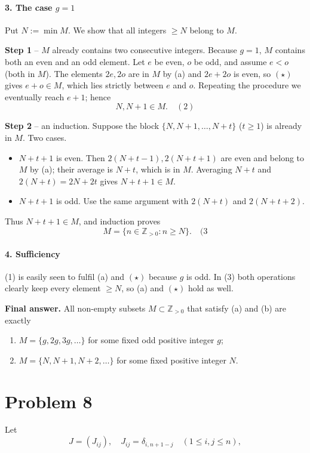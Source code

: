 \documentclass[12pt,a4paper]{article}
\theoremstyle{definition}
\begin{document}
\paragraph{3. The case $g = 1$}
Put $N := \min M$. We show that all integers $\geq N$ belong to $M$.

\textbf{Step 1} -- $M$ already contains two consecutive integers.
Because $g=1$, $M$ contains both an even and an odd element. Let $e$ be even, $o$ be odd, and assume $e < o$ (both in $M$). The elements $2e, 2o$ are in $M$ by (a) and $2e+2o$ is even, so $(\star)$ gives $e+o \in M$, which lies strictly between $e$ and $o$. Repeating the procedure we eventually reach $e+1$; hence
\[
N, N+1 \in M. \quad {(2)}
\]

\textbf{Step 2} -- an induction.
Suppose the block $\{N, N+1, \ldots, N+t\}$ ($t \geq 1$) is already in $M$.
Two cases.

\begin{itemize}
\item $N+t+1$ is even.
Then $2(N+t-1), 2(N+t+1)$ are even and belong to $M$ by (a); their average is $N+t$, which is in $M$. Averaging $N+t$ and $2(N+t) = 2N+2t$ gives $N+t+1 \in M$.

\item $N+t+1$ is odd. Use the same argument with $2(N+t)$ and $2(N+t+2)$.
\end{itemize}

Thus $N+t+1 \in M$, and induction proves
\[
M = \{ n \in \mathbb{Z}_{>0} : n \geq N \}. \quad {(3}
\]

\paragraph{4. Sufficiency}
(1) is easily seen to fulfil (a) and $(\star)$ because $g$ is odd.
In (3) both operations clearly keep every element $\geq N$, so (a) and $(\star)$ hold as well.

\textbf{Final answer.}
All non-empty subsets $M \subset \mathbb{Z}_{>0}$ that satisfy (a) and (b) are exactly
\begin{enumerate}
\item $M = \{ g, 2g, 3g, \ldots \}$ for some fixed odd positive integer $g$;
\item $M = \{ N, N+1, N+2, \ldots \}$ for some fixed positive integer $N$.
\end{enumerate}

\section{Problem 8}
Let
$$J = (J_{ij}),\quad J_{ij}=\delta_{i,n+1-j}\quad(1\leq i,j\leq n),$$
\end{document}
